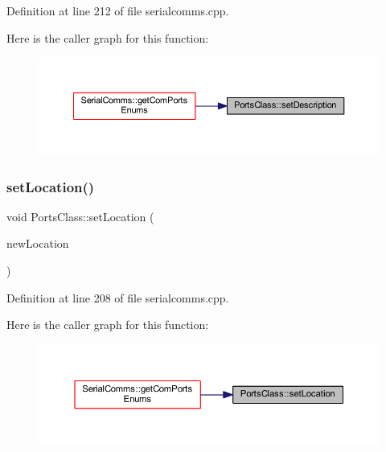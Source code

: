 Definition at line 212 of file serialcomms.\+cpp.

Here is the caller graph for this function\+:
\nopagebreak
\begin{figure}[H]
\begin{center}
\leavevmode
\includegraphics[width=350pt]{class_ports_class_a2f06af1956265d0079be56b9b85c3a0f_icgraph}
\end{center}
\end{figure}
\mbox{\label{class_ports_class_a1a5f185d5b9db6407d943187778f3782}} 
\subsubsection{\texorpdfstring{setLocation()}{setLocation()}}
{\footnotesize\ttfamily void Ports\+Class\+::set\+Location (\begin{DoxyParamCaption}\item[{Q\+String}]{new\+Location }\end{DoxyParamCaption})}



Definition at line 208 of file serialcomms.\+cpp.

Here is the caller graph for this function\+:
\nopagebreak
\begin{figure}[H]
\begin{center}
\leavevmode
\includegraphics[width=350pt]{class_ports_class_a1a5f185d5b9db6407d943187778f3782_icgraph}
\end{center}
\end{figure}
\mbox{\label{class_ports_class_a0ac6d29d8868c2ebde8811d0249d7e41}} 
